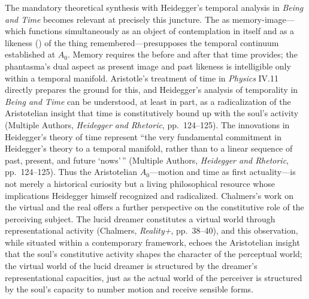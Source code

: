 The mandatory theoretical synthesis with Heidegger's temporal analysis in \textit{Being and Time} becomes relevant at precisely this juncture. The  as memory-image---which functions simultaneously as an object of contemplation in itself and as a likeness () of the thing remembered---presupposes the temporal continuum established at $A_0$. Memory requires the before and after that time provides; the phantasma's dual aspect as present image and past likeness is intelligible only within a temporal manifold. Aristotle's treatment of time in \textit{Physics} IV.11 directly prepares the ground for this, and Heidegger's analysis of temporality in \textit{Being and Time} can be understood, at least in part, as a radicalization of the Aristotelian insight that time is constitutively bound up with the soul's activity (Multiple Authors, \textit{Heidegger and Rhetoric}, pp.~124--125). The innovations in Heidegger's theory of time represent ``the very fundamental commitment in Heidegger's theory to a temporal manifold, rather than to a linear sequence of past, present, and future `nows'\,'' (Multiple Authors, \textit{Heidegger and Rhetoric}, pp.~124--125). Thus the Aristotelian $A_0$---motion and time as first actuality---is not merely a historical curiosity but a living philosophical resource whose implications Heidegger himself recognized and radicalized. Chalmers's work on the virtual and the real offers a further perspective on the constitutive role of the perceiving subject. The lucid dreamer constitutes a virtual world through representational activity (Chalmers, \textit{Reality+}, pp.~38--40), and this observation, while situated within a contemporary framework, echoes the Aristotelian insight that the soul's constitutive activity shapes the character of the perceptual world; the virtual world of the lucid dreamer is structured by the dreamer's representational capacities, just as the actual world of the perceiver is structured by the soul's capacity to number motion and receive sensible forms.
